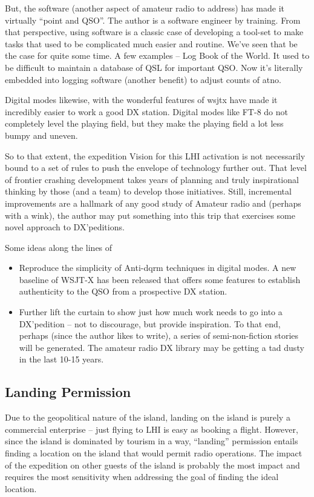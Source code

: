 \documentclass[11pt]{article}
\begin{document}
\par
But, the software
(another aspect of amateur radio to address) has made it virtually
``point and QSO''.  The author is a software engineer by training.
From that perspective, using software is a classic case of developing
a tool-set to make tasks that used to be complicated much easier and
routine.   We've seen that be the case for quite some time.  A few
examples -- Log Book of the World.   It used to be difficult to 
maintain a database of QSL for important QSO. Now it's literally
embedded into logging software (another benefit) to adjust
counts of {\gls{atno}}.
\par
Digital modes likewise, with the wonderful features of {\gls{wsjtx}}
have made it incredibly easier to work a good DX station.   Digital
modes like FT-8 do not completely level the playing field, but they
make the playing field a lot less bumpy and uneven.
\par
So to that extent, the expedition Vision for this LHI activation
is not necessarily bound to a set of rules to push the envelope of
technology further out.  That level of frontier crashing development
takes years of planning and truly inspirational thinking by those
(and a team) to develop those initiatives.   Still, incremental
improvements are a hallmark of any good study of Amateur radio and
(perhaps with a wink), the author may put something into this
trip that exercises some novel approach to DX'peditions.
\par
Some ideas along the lines of
\begin{itemize}
\item Reproduce the simplicity of Anti-{\gls{dqrm}} techniques in digital 
modes.
A new baseline of WSJT-X has been released that offers some features
to establish authenticity to the QSO from a prospective DX station.
\item Further lift the curtain to show just how much work needs to
go into a DX'pedition -- not to discourage, but provide inspiration.
To that end, perhaps (since the author likes to write), a series of 
semi-non-fiction stories will be generated.   The amateur radio
DX library may be getting a tad dusty in the last 10-15 years.
\end{itemize}

\subsection{Landing Permission}

Due to the geopolitical nature of the island, landing on the island is
purely a commercial enterprise -- just flying to LHI
is easy as booking a flight.  However, since the island is dominated
by tourism in a way, ``landing'' permission entails finding a location
on the island that would permit radio operations.   The impact
of the expedition on other guests of the island is probably the most impact
and requires the most sensitivity when addressing the goal of finding
the ideal location.
\end{document}
